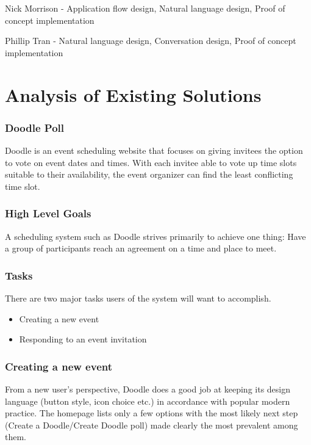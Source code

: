 \documentclass{sigchi}
\begin{document}
Nick Morrison - Application flow design, Natural language design, Proof of concept implementation

Phillip Tran - Natural language design, Conversation design, Proof of concept implementation


\section{Analysis of Existing Solutions}

\subsubsection{Doodle Poll}


Doodle is an event scheduling website that focuses on giving invitees the option to vote on event dates and times. With each invitee able to vote up time slots suitable to their availability, the event organizer can find the least conflicting time slot.

\subsubsection{High Level Goals}

A scheduling system such as Doodle strives primarily to achieve one
thing: Have a group of participants reach an agreement on a time and
place to meet.

\subsubsection{Tasks}

There are two major tasks users of the system will want
to accomplish.

\begin{itemize}
\item Creating a new event
\item Responding to an event invitation
\end{itemize}

\subsubsection{Creating a new event}

From a new user's perspective, Doodle does a good job at keeping its
design language (button style, icon choice etc.) in accordance with
popular modern practice. The homepage lists only a few options with
the most likely next step (Create a Doodle/Create Doodle poll) made
clearly the most prevalent among them.
\end{document}
